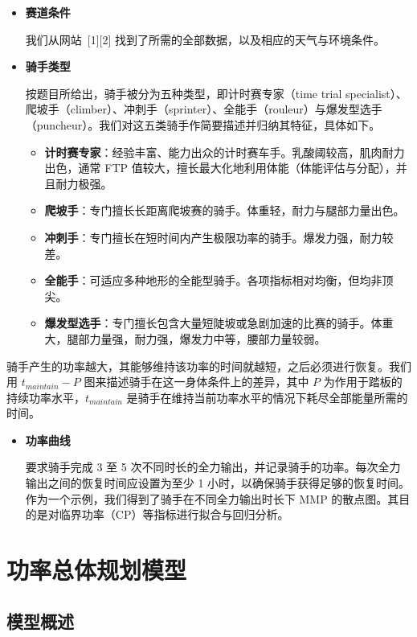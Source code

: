 \documentclass[11pt,a4paper]{ctexart}
\begin{document}
\begin{itemize}
\item \textbf{赛道条件}

我们从网站\ [1][2] 找到了所需的全部数据，以及相应的天气与环境条件。

\item \textbf{骑手类型}

按题目所给出，骑手被分为五种类型，即计时赛专家（time trial specialist）、爬坡手（climber）、冲刺手（sprinter）、全能手（rouleur）与爆发型选手（puncheur）。我们对这五类骑手作简要描述并归纳其特征，具体如下。

\begin{itemize}
\item \textbf{计时赛专家}：经验丰富、能力出众的计时赛车手。乳酸阈较高，肌肉耐力出色，通常 FTP 值较大，擅长最大化地利用体能（体能评估与分配），并且耐力极强。
\item \textbf{爬坡手}：专门擅长长距离爬坡赛的骑手。体重轻，耐力与腿部力量出色。
\item \textbf{冲刺手}：专门擅长在短时间内产生极限功率的骑手。爆发力强，耐力较差。
\item \textbf{全能手}：可适应多种地形的全能型骑手。各项指标相对均衡，但均非顶尖。
\item \textbf{爆发型选手}：专门擅长包含大量短陡坡或急剧加速的比赛的骑手。体重大，腿部力量强，耐力强，爆发力中等，腰部力量较弱。
\end{itemize}
\end{itemize}

骑手产生的功率越大，其能够维持该功率的时间就越短，之后必须进行恢复。我们用 $t_{maintain}-P$ 图来描述骑手在这一身体条件上的差异，其中 $P$ 为作用于踏板的持续功率水平，$t_{maintain}$ 是骑手在维持当前功率水平的情况下耗尽全部能量所需的时间。

\begin{itemize}
\item \textbf{功率曲线}

要求骑手完成 3 至 5 次不同时长的全力输出，并记录骑手的功率。每次全力输出之间的恢复时间应设置为至少 1 小时，以确保骑手获得足够的恢复时间。作为一个示例，我们得到了骑手在不同全力输出时长下 MMP 的散点图。其目的是对临界功率（CP）等指标进行拟合与回归分析。
\end{itemize}

\section{功率总体规划模型}

\subsection{模型概述}
\end{document}
